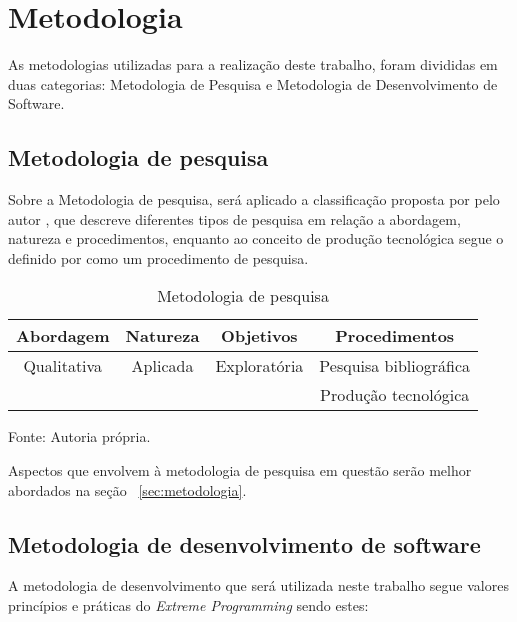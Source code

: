 \section{Metodologia}

 As metodologias utilizadas para a realização deste trabalho, foram divididas em duas categorias: Metodologia de Pesquisa e Metodologia de Desenvolvimento de Software.

\subsection{Metodologia de pesquisa}

Sobre a Metodologia de pesquisa, será aplicado a classificação proposta por pelo autor \cite{Gerhardt2009}, que descreve diferentes tipos de pesquisa em relação a abordagem, natureza e procedimentos, enquanto ao conceito de produção tecnológica segue o definido por \cite{Serzedello_Tomael_2011} como um procedimento de pesquisa.

\begin{table}[ht]
    \centering
    
    \begin{tabular}{|c|c|c|c|}
    \hline
    \textbf{Abordagem} & \textbf{Natureza} & \textbf{Objetivos} & \textbf{Procedimentos} \\ \hline
    Qualitativa        & Aplicada          & Exploratória       & Pesquisa bibliográfica \\ 
                    &                   &                    & Produção tecnológica   \\ \hline
    \end{tabular}
    \caption{Metodologia de pesquisa}
    Fonte: Autoria própria.
    
\end{table}

Aspectos que envolvem à metodologia de pesquisa em questão serão melhor abordados na seção ~\ref{sec:metodologia}.

\subsection{Metodologia de desenvolvimento de software}

A metodologia de desenvolvimento que será utilizada neste trabalho segue valores princípios e práticas do  \emph{Extreme Programming} \cite{beckKent2004} sendo estes:


